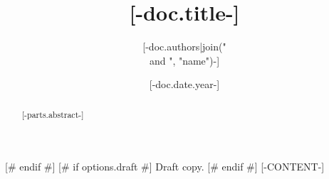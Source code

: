 \documentclass{article}
[-IMPORTS-]
\title{[-doc.title-]}
\author{[-doc.authors|join(" \\and ", "name")-]}
[# if doc.date #]
\date{[-doc.date.year-]}
[# else #]
\date{}
[# endif #]
\begin{document}
\begin{abstract}
[-parts.abstract-]
\end{abstract}
[# endif #]
[# if options.draft #]
Draft copy.
[# endif #]
[-CONTENT-]
\end{document}
